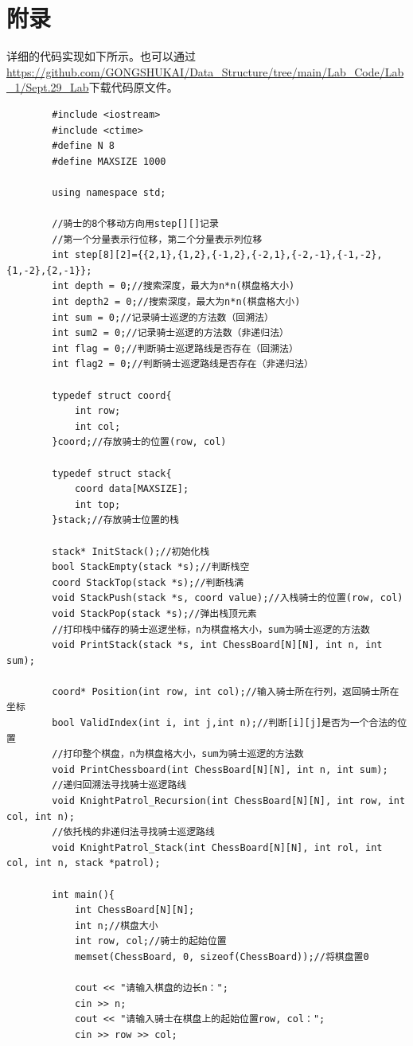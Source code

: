 \documentclass[10pt,a4paper]{article}
\begin{document}
	\section{附录}
	\noindent 详细的代码实现如下所示。也可以通过\url{https://github.com/GONGSHUKAI/Data_Structure/tree/main/Lab_Code/Lab_1/Sept.29_Lab}下载代码原文件。
	\begin{verbatim}
		#include <iostream>
		#include <ctime>
		#define N 8 
		#define MAXSIZE 1000

		using namespace std;

		//骑士的8个移动方向用step[][]记录
		//第一个分量表示行位移，第二个分量表示列位移
		int step[8][2]={{2,1},{1,2},{-1,2},{-2,1},{-2,-1},{-1,-2},{1,-2},{2,-1}};
		int depth = 0;//搜索深度，最大为n*n(棋盘格大小)
		int depth2 = 0;//搜索深度，最大为n*n(棋盘格大小)
		int sum = 0;//记录骑士巡逻的方法数（回溯法）
		int sum2 = 0;//记录骑士巡逻的方法数（非递归法）
		int flag = 0;//判断骑士巡逻路线是否存在（回溯法）
		int flag2 = 0;//判断骑士巡逻路线是否存在（非递归法）

		typedef struct coord{
			int row;
			int col;
		}coord;//存放骑士的位置(row, col)

		typedef struct stack{
			coord data[MAXSIZE];
			int top;
		}stack;//存放骑士位置的栈

		stack* InitStack();//初始化栈
		bool StackEmpty(stack *s);//判断栈空
		coord StackTop(stack *s);//判断栈满
		void StackPush(stack *s, coord value);//入栈骑士的位置(row, col)
		void StackPop(stack *s);//弹出栈顶元素
		//打印栈中储存的骑士巡逻坐标，n为棋盘格大小，sum为骑士巡逻的方法数
		void PrintStack(stack *s, int ChessBoard[N][N], int n, int sum);

		coord* Position(int row, int col);//输入骑士所在行列，返回骑士所在坐标
		bool ValidIndex(int i, int j,int n);//判断[i][j]是否为一个合法的位置
		//打印整个棋盘，n为棋盘格大小，sum为骑士巡逻的方法数
		void PrintChessboard(int ChessBoard[N][N], int n, int sum);
		//递归回溯法寻找骑士巡逻路线
		void KnightPatrol_Recursion(int ChessBoard[N][N], int row, int col, int n);
		//依托栈的非递归法寻找骑士巡逻路线
		void KnightPatrol_Stack(int ChessBoard[N][N], int rol, int col, int n, stack *patrol);

		int main(){
			int ChessBoard[N][N];
			int n;//棋盘大小
			int row, col;//骑士的起始位置
			memset(ChessBoard, 0, sizeof(ChessBoard));//将棋盘置0
			
			cout << "请输入棋盘的边长n：";
			cin >> n;
			cout << "请输入骑士在棋盘上的起始位置row, col：";
			cin >> row >> col;
			

\end{verbatim}
\end{document}
